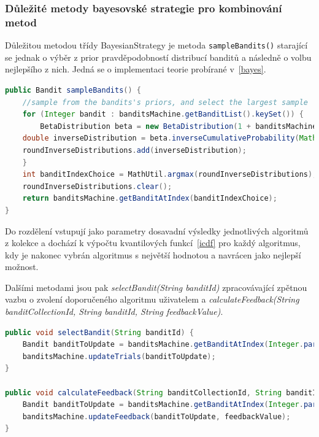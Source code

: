 \documentclass[thesis=M,czech]{FITthesis}[2014/05/07]
\begin{document}
\subsubsection{Důležité metody bayesovské strategie pro kombinování metod}
	Důležitou metodou třídy BayesianStrategy je metoda \texttt{sampleBandits()} starající se jednak o výběr z prior pravděpodobností distribucí banditů a následně o volbu nejlepšího z nich. Jedná se o implementaci teorie probírané v~\ref{bayes}.
	
\begin{lstlisting}[language=java]
public Bandit sampleBandits() {
    //sample from the bandits's priors, and select the largest sample
    for (Integer bandit : banditsMachine.getBanditList().keySet()) {
        BetaDistribution beta = new BetaDistribution(1 + banditsMachine.getBanditAtIndex(bandit).getSuccesses(), 1 + banditsMachine.getBanditAtIndex(bandit).getTrials() - banditsMachine.getBanditAtIndex(bandit).getSuccesses());
    double inverseDistribution = beta.inverseCumulativeProbability(Math.random());
    roundInverseDistributions.add(inverseDistribution);
    }
    int banditIndexChoice = MathUtil.argmax(roundInverseDistributions);
    roundInverseDistributions.clear();
    return banditsMachine.getBanditAtIndex(banditIndexChoice);
}
\end{lstlisting}	

Do rozdělení vstupují jako parametry dosavadní výsledky jednotlivých algoritmů z kolekce a dochází k výpočtu kvantilových funkcí~\ref{icdf} pro každý algoritmus, kdy je nakonec vybrán algoritmus s největší hodnotou a navrácen jako nejlepší možnost. 

Dalšími metodami jsou pak \emph{selectBandit(String banditId)} zpracovávající zpětnou vazbu o zvolení doporučeného algoritmu uživatelem a \emph{calculateFeedback(String banditCollectionId, String banditId, String feedbackValue)}. 

\begin{lstlisting}[language=java]
public void selectBandit(String banditId) {
    Bandit banditToUpdate = banditsMachine.getBanditAtIndex(Integer.parseInt(banditId));        
    banditsMachine.updateTrials(banditToUpdate);           
}

public void calculateFeedback(String banditCollectionId, String banditId, String feedbackValue) {
    Bandit banditToUpdate = banditsMachine.getBanditAtIndex(Integer.parseInt(banditId));
    banditsMachine.updateFeedback(banditToUpdate, feedbackValue);   
}  
\end{lstlisting}	
\end{document}
